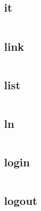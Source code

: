 \begin{lstlisting}[language=bash]

\end{lstlisting}

\subsection{it}


\begin{lstlisting}[language=bash]

\end{lstlisting}

\subsection{link}


\begin{lstlisting}[language=bash]

\end{lstlisting}

\subsection{list}


\begin{lstlisting}[language=bash]

\end{lstlisting}

\subsection{ln}



\begin{lstlisting}[language=bash]

\end{lstlisting}

\subsection{login}



\begin{lstlisting}[language=bash]

\end{lstlisting}

\subsection{logout}



